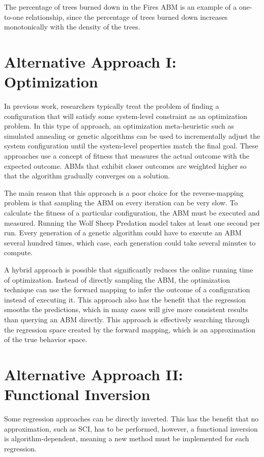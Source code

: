 The percentage of trees burned down in the Fires ABM is an example of a one-to-one relationship, since the percentage of trees burned down increases monotonically with the density of the trees.


\section{Alternative Approach I: Optimization}
In previous work, researchers typically treat the problem of finding a configuration that will satisfy some system-level constraint as an optimization problem.
In this type of approach, an optimization meta-heuristic such as simulated annealing or genetic algorithms can be used to incrementally adjust the system configuration until the system-level properties match the final goal.
These approaches use a concept of fitness that measures the actual outcome with the expected outcome.
ABMs that exhibit closer outcomes are weighted higher so that the algorithm gradually converges on a solution.

The main reason that this approach is a poor choice for the reverse-mapping problem is that sampling the ABM on every iteration can be very slow.
To calculate the fitness of a particular configuration, the ABM must be executed and measured.
Running the Wolf Sheep Predation model takes at least one second per run.
Every generation of a genetic algorithm could have to execute an ABM several hundred times, which case, each generation could take several minutes to compute.

A hybrid approach is possible that significantly reduces the online running time of optimization.
Instead of directly sampling the ABM, the optimization technique can use the forward mapping to infer the outcome of a configuration instead of executing it.
This approach also has the benefit that the regression smooths the predictions, which in many cases will give more consistent results than querying an ABM directly.
This approach is effectively searching through the regression space created by the forward mapping, which is an approximation of the true behavior space.

\section{Alternative Approach II: Functional Inversion}\label{sec:functional}

Some regression approaches can be directly inverted.
This has the benefit that no approximation, such as SCI, has to be performed, however, a functional inversion is algorithm-dependent, meaning a new method must be implemented for each regression.

